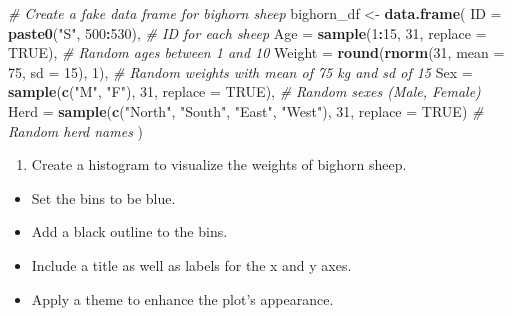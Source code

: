 \documentclass[
]{book}
\newenvironment{Shaded}{\begin{snugshade}}{\end{snugshade}}
\newcommand{\AttributeTok}[1]{\textcolor[rgb]{0.13,0.29,0.53}{#1}}
\newcommand{\CommentTok}[1]{\textcolor[rgb]{0.56,0.35,0.01}{\textit{#1}}}
\newcommand{\ConstantTok}[1]{\textcolor[rgb]{0.56,0.35,0.01}{#1}}
\newcommand{\DecValTok}[1]{\textcolor[rgb]{0.00,0.00,0.81}{#1}}
\newcommand{\FunctionTok}[1]{\textcolor[rgb]{0.13,0.29,0.53}{\textbf{#1}}}
\newcommand{\NormalTok}[1]{#1}
\newcommand{\OtherTok}[1]{\textcolor[rgb]{0.56,0.35,0.01}{#1}}
\newcommand{\SpecialCharTok}[1]{\textcolor[rgb]{0.81,0.36,0.00}{\textbf{#1}}}
\newcommand{\StringTok}[1]{\textcolor[rgb]{0.31,0.60,0.02}{#1}}
\providecommand{\tightlist}{%
  \setlength{\itemsep}{0pt}\setlength{\parskip}{0pt}}
\begin{document}
\begin{Shaded}
\begin{Highlighting}[]
\CommentTok{\# Create a fake data frame for bighorn sheep}
\NormalTok{bighorn\_df }\OtherTok{\textless{}{-}} \FunctionTok{data.frame}\NormalTok{(}
  \AttributeTok{ID =} \FunctionTok{paste0}\NormalTok{(}\StringTok{"S"}\NormalTok{, }\DecValTok{500}\SpecialCharTok{:}\DecValTok{530}\NormalTok{),      }\CommentTok{\# ID for each sheep}
  \AttributeTok{Age =} \FunctionTok{sample}\NormalTok{(}\DecValTok{1}\SpecialCharTok{:}\DecValTok{15}\NormalTok{, }\DecValTok{31}\NormalTok{, }\AttributeTok{replace =} \ConstantTok{TRUE}\NormalTok{),  }\CommentTok{\# Random ages between 1 and 10}
  \AttributeTok{Weight =} \FunctionTok{round}\NormalTok{(}\FunctionTok{rnorm}\NormalTok{(}\DecValTok{31}\NormalTok{, }\AttributeTok{mean =} \DecValTok{75}\NormalTok{, }\AttributeTok{sd =} \DecValTok{15}\NormalTok{), }\DecValTok{1}\NormalTok{),  }\CommentTok{\# Random weights with mean of 75 kg and sd of 15}
  \AttributeTok{Sex =} \FunctionTok{sample}\NormalTok{(}\FunctionTok{c}\NormalTok{(}\StringTok{"M"}\NormalTok{, }\StringTok{"F"}\NormalTok{), }\DecValTok{31}\NormalTok{, }\AttributeTok{replace =} \ConstantTok{TRUE}\NormalTok{),     }\CommentTok{\# Random sexes (Male, Female)}
  \AttributeTok{Herd =} \FunctionTok{sample}\NormalTok{(}\FunctionTok{c}\NormalTok{(}\StringTok{"North"}\NormalTok{, }\StringTok{"South"}\NormalTok{, }\StringTok{"East"}\NormalTok{, }\StringTok{"West"}\NormalTok{), }\DecValTok{31}\NormalTok{, }\AttributeTok{replace =} \ConstantTok{TRUE}\NormalTok{)  }\CommentTok{\# Random herd names}
\NormalTok{)}
\end{Highlighting}
\end{Shaded}

\begin{enumerate}
\def\labelenumi{\arabic{enumi}.}
\setcounter{enumi}{1}
\tightlist
\item
  Create a histogram to visualize the weights of bighorn sheep.
\end{enumerate}

\begin{itemize}
\tightlist
\item
  Set the bins to be blue.
\item
  Add a black outline to the bins.
\item
  Include a title as well as labels for the x and y axes.
\item
  Apply a theme to enhance the plot's appearance.
\end{itemize}
\end{document}
